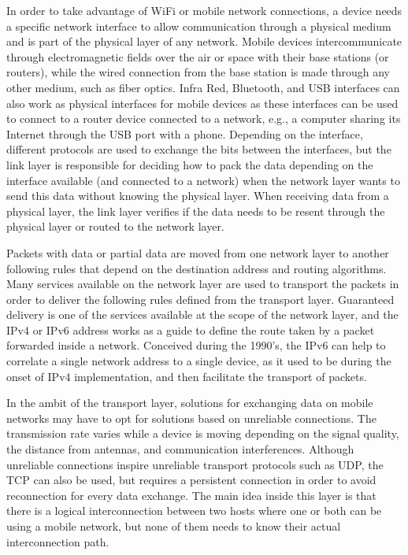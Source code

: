 In order to take advantage of WiFi or mobile network connections, a device needs a specific network interface to allow communication through a physical medium and is part of the physical layer of any network.
Mobile devices intercommunicate through electromagnetic fields over the air or space with their base stations (or routers), while the wired connection from the base station is made through any other medium, such as fiber optics.
Infra Red, Bluetooth, and USB interfaces can also work as physical
interfaces for mobile devices as these interfaces can be used to connect to a router device connected to a network, e.g., a computer sharing its Internet through the USB port with a phone.
Depending on the interface, different protocols are used to exchange the bits between the interfaces, but the link layer is responsible for deciding how to pack the data depending on the interface available (and connected to a network) when the network layer wants to send this data without knowing the physical layer.
When receiving data from a physical layer, the link layer verifies if the data needs to be resent through the physical layer or routed to the network layer.

Packets with data or partial data are moved from one network layer to another following rules that depend on the destination address and routing algorithms.
Many services available on the network layer are used to transport the packets in order to deliver the following rules defined from the transport layer.
Guaranteed delivery is one of the services available at the scope of the network layer, and the IPv4 or IPv6 address works as a guide to define the route taken by a packet forwarded inside a network.
Conceived during the 1990's, the IPv6 can help to correlate a single network address to a single device, as it used to be during the onset of IPv4 implementation, and then facilitate the transport of packets.

In the ambit of the transport layer, solutions for exchanging data on mobile networks may have to opt for solutions based on unreliable connections.
The transmission rate varies while a device is moving depending on the signal quality, the distance from antennas, and communication interferences.
Although unreliable connections inspire unreliable transport protocols such as UDP, the TCP can also be used, but requires a persistent connection in order to avoid reconnection for every data exchange.
The main idea inside this layer is that there is a logical interconnection between two hosts where one or both can be using a mobile network, but none of them needs to know their actual interconnection path.


